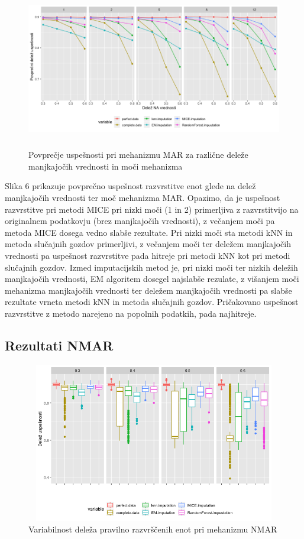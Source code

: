 \documentclass[12pt,a4paper]{article}
\begin{document}
\begin{figure}[ht]
	\centering
	\includegraphics[width= 12cm, height = 7cm]{img/MAR_line_mean.png}
	\caption{Povprečje uspešnosti pri mehanizmu MAR za različne deleže manjkajočih vrednosti in moči mehanizma} 
	\label{fig:6}
\end{figure}

\noindent Slika 6 prikazuje povprečno uspešnost razvrstitve enot glede na delež manjkajočih vrednosti ter moč mehanizma MAR. Opazimo, da je uspešnost razvrstitve pri metodi MICE pri nizki moči (1 in 2) primerljiva z razvrstitvijo na originalnem podatkovju (brez manjkajočih vrednosti), z večanjem moči pa metoda MICE dosega vedno slabše rezultate. Pri nizki moči sta metodi kNN in metoda slučajnih gozdov primerljivi, z večanjem moči ter deležem manjkajočih vrednosti pa uspešnost razvrstitve pada hitreje pri metodi kNN kot pri metodi slučajnih gozdov. Izmed imputacijskih metod je, pri nizki moči ter nizkih deležih manjkajočih vrednosti, EM algoritem dosegel najslabše rezulate, z višanjem moči mehanizma manjkajočih vrednosti ter deležem manjkajočih vrednosti pa slabše rezultate vrneta metodi kNN in metoda slučajnih gozdov. Pričakovano uspešnost razvrstitve z metodo narejeno na  popolnih podatkih, pada najhitreje. 


\subsection{Rezultati NMAR}

\begin{figure}[ht]
	\centering
	\includegraphics[width= 12cm, height = 7cm]{img/NMAR_boxplot.png}
	\caption{Variabilnost deleža pravilno razvrščenih enot pri mehanizmu NMAR} 
	\label{fig:7}
\end{figure}
\end{document}
